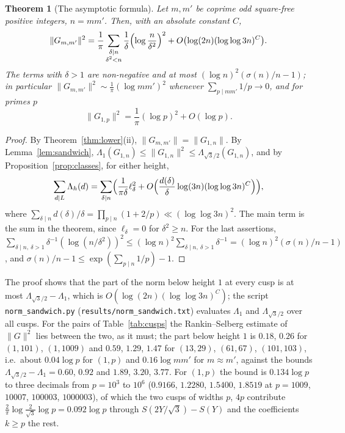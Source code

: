﻿\documentclass[11pt]{amsart}
\newtheorem{theorem}{Theorem}[section]
\theoremstyle{remark}
\begin{document}
\begin{theorem}[The asymptotic formula]\label{thm:asymp}
Let $m,m'$ be coprime odd square-free positive integers, $n=mm'$. Then, with an absolute constant $C$,
\[
\|G_{m,m'}\|^2=\frac1\pi\sum_{\substack{\delta\mid n\\ \delta^2<n}}\frac1\delta\Bigl(\log\frac n{\delta^2}\Bigr)^2+O\bigl(\log(2n)(\log\log3n)^{C}\bigr).
\]
The terms with $\delta>1$ are non-negative and at most $(\log n)^2(\sigma(n)/n-1)$; in particular $\|G_{m,m'}\|^2\sim\frac1\pi(\log mm')^2$ whenever $\sum_{p\mid mm'}1/p\to0$, and for primes $p$
\[
\|G_{1,p}\|^2=\frac1\pi(\log p)^2+O(\log p).
\]
\end{theorem}
\begin{proof}
By Theorem~\ref{thm:lower}(ii), $\|G_{m,m'}\|=\|G_{1,n}\|$. By Lemma~\ref{lem:sandwich}, $\Lambda_1(G_{1,n})\le\|G_{1,n}\|^2\le\Lambda_{\sqrt3/2}(G_{1,n})$, and by Proposition~\ref{prop:classes}, for either height,
\[
\sum_{d\mid L}\Lambda_h(d)=\sum_{\delta\mid n}\Bigl(\frac1{\pi\delta}\ell_\delta^2+O\Bigl(\frac{d(\delta)}\delta\log(3n)(\log\log3n)^{C}\Bigr)\Bigr),
\]
where $\sum_{\delta\mid n}d(\delta)/\delta=\prod_{p\mid n}(1+2/p)\ll(\log\log3n)^2$. The main term is the sum in the theorem, since $\ell_\delta=0$ for $\delta^2\ge n$. For the last assertions, $\sum_{\delta\mid n,\ \delta>1}\delta^{-1}(\log(n/\delta^2))^2\le(\log n)^2\sum_{\delta\mid n,\ \delta>1}\delta^{-1}=(\log n)^2(\sigma(n)/n-1)$, and $\sigma(n)/n-1\le\exp(\sum_{p\mid n}1/p)-1$.
\end{proof}

The proof shows that the part of the norm below height $1$ at every cusp is at most $\Lambda_{\sqrt3/2}-\Lambda_1$, which is $O(\log(2n)(\log\log3n)^{C})$; the script \texttt{norm\_sandwich.py} (\texttt{results/norm\_sandwich.txt}) evaluates $\Lambda_1$ and $\Lambda_{\sqrt3/2}$ over all cusps. For the pairs of Table~\ref{tab:cusps} the Rankin--Selberg estimate of $\|G\|^2$ lies between the two, as it must; the part below height $1$ is $0.18$, $0.26$ for $(1,101)$, $(1,1009)$ and $0.59$, $1.29$, $1.47$ for $(13,29)$, $(61,67)$, $(101,103)$, i.e.\ about $0.04\log p$ for $(1,p)$ and $0.16\log mm'$ for $m\approx m'$, against the bounds $\Lambda_{\sqrt3/2}-\Lambda_1=0.60$, $0.92$ and $1.89$, $3.20$, $3.77$. For $(1,p)$ the bound is $0.134\log p$ to three decimals from $p=10^3$ to $10^6$ ($0.9166$, $1.2280$, $1.5400$, $1.8519$ at $p=1009$, $10007$, $100003$, $1000003$), of which the two cusps of widths $p$, $4p$ contribute $\frac2\pi\log\frac2{\sqrt3}\log p=0.092\log p$ through $S(2Y/\sqrt3)-S(Y)$ and the coefficients $k\ge p$ the rest.
\end{document}
